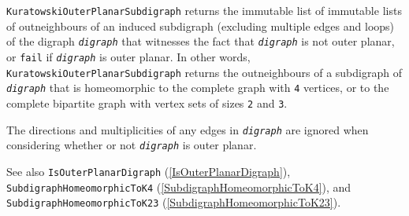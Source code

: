 \documentclass[a4paper,11pt]{report}
\begin{document}
{{{ \texttt{KuratowskiOuterPlanarSubdigraph} returns the immutable list of immutable lists of
out\texttt{}neighbours of an induced subdigraph (excluding multiple
edges and loops) of the digraph \mbox{\texttt{\mdseries\slshape digraph}} that witnesses the fact that \mbox{\texttt{\mdseries\slshape digraph}} is not outer planar, or \texttt{fail} if \mbox{\texttt{\mdseries\slshape digraph}} is outer planar. In other words, \texttt{KuratowskiOuterPlanarSubdigraph} returns the out\texttt{}neighbours of a subdigraph of \mbox{\texttt{\mdseries\slshape digraph}} that is homeomorphic to the complete graph with \texttt{4} vertices, or to the complete bipartite graph with vertex sets of sizes \texttt{2} and \texttt{3}. 

 The directions and multiplicities of any edges in \mbox{\texttt{\mdseries\slshape digraph}} are ignored when considering whether or not \mbox{\texttt{\mdseries\slshape digraph}} is outer planar. 

 See also \texttt{IsOuterPlanarDigraph} (\ref{IsOuterPlanarDigraph}), \texttt{SubdigraphHomeomorphicToK4} (\ref{SubdigraphHomeomorphicToK4}), and \texttt{SubdigraphHomeomorphicToK23} (\ref{SubdigraphHomeomorphicToK23}). 

}}}
\end{document}
